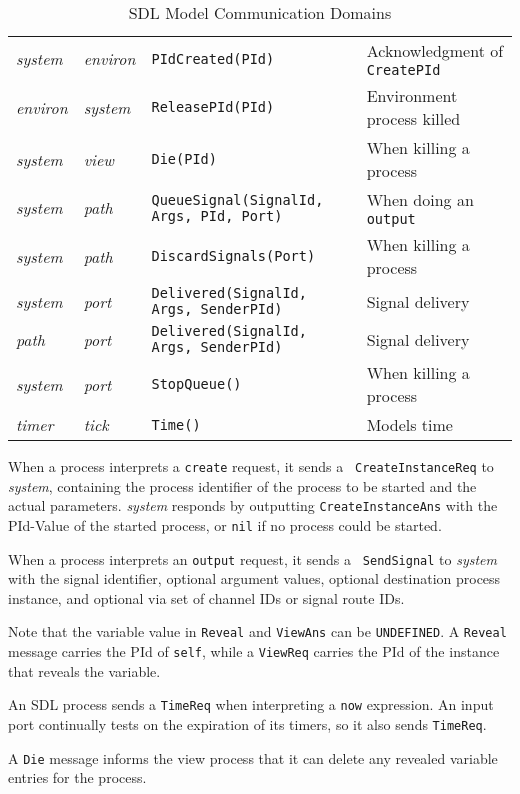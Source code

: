 \begin{table}
\begin{tabular}{|l|l|l|l|}
{\em system} & {\em environ} & {\tt PIdCreated(PId)} & 
Acknowledgment of {\tt CreatePId}\\
{\em environ} & {\em system} & {\tt ReleasePId(PId)} &
Environment process killed\\
\hline
{\em system} & {\em view} & {\tt Die(PId)} & When killing a process\\
\hline
{\em system} & {\em path} & {\tt QueueSignal(SignalId, Args,
PId, Port)} & When doing an {\tt output}\\
{\em system} & {\em path} & {\tt DiscardSignals(Port)} & When killing
a process\\
\hline
{\em system} & {\em port} & {\tt Delivered(SignalId, Args,
SenderPId)} & Signal delivery\\
{\em path} & {\em port} & {\tt Delivered(SignalId, Args,
SenderPId)} & Signal delivery\\
\hline
{\em system} & {\em port} & {\tt StopQueue()} & When killing a
process\\
\hline
{\em timer} & {\em tick} & {\tt Time()} & Models time\\
\hline
\end{tabular}
\label{CommDom}
\caption{SDL Model Communication Domains}
\end{table}

When a process interprets a {\tt create} request, it sends a {\tt
CreateInstanceReq} to {\em system}, containing the process
identifier of the process to be started and the actual parameters.
{\em system} responds by outputting {\tt CreateInstanceAns} with
the PId-Value of the started process, or {\tt nil} if no process
could be started.

When a process interprets an {\tt output} request, it sends a {\tt
SendSignal} to {\em system} with the signal identifier, optional
argument values, optional destination process instance, and optional
via set of channel IDs or signal route IDs.

Note that the variable value in {\tt Reveal} and {\tt ViewAns}
can be {\tt UNDEFINED}.
A {\tt Reveal} message carries the PId of {\tt self}, while a
{\tt ViewReq} carries the PId of the instance that reveals the variable.

An SDL process sends a {\tt TimeReq} when interpreting a {\tt now}
expression. 
An input port continually tests on the expiration of its
timers, so it also sends {\tt TimeReq}.

A {\tt Die} message informs the view process that it can delete any
revealed variable entries for the process.

